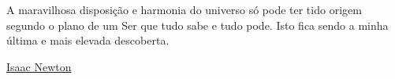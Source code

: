 
\null\vfill
\begin{flushright}
    \begin{minipage}{9.0cm}
        A maravilhosa disposição e harmonia do universo só pode ter tido origem
        segundo o plano de um Ser que tudo sabe e tudo pode.
        Isto fica sendo a minha última e mais elevada descoberta.
    \end{minipage}
\end{flushright}

\begin{flushright}
    \href{http://www.fraseseproverbios.com/frases-de-isaac-newton.php}{Isaac Newton}
\end{flushright}

\cleardoublepage{}
